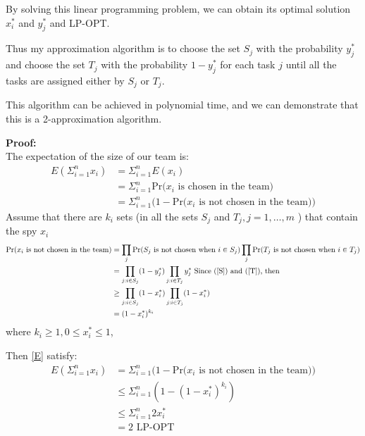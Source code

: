 \documentclass[a4paper,12pt]{article}
\begin{document}
By solving this linear programming problem, we can obtain its optimal solution $x_i^*$ and $y_j^*$ and LP-OPT. 

Thus my approximation algorithm is to choose the set $S_j$ with the probability $y_j^*$ and choose the set $T_j$ with the probability $1-y_j^*$ for each task $j$ until all the tasks are assigned either by $S_j$ or $T_j$. 

This algorithm can be achieved in polynomial time, and we can demonstrate that this is a 2-approximation algorithm.

\noindent \textbf{Proof:\\}
The expectation  of the size of our team is:
\begin{align} 
E(\Sigma_{ i= 1}^n   x_{i}) & = \Sigma_{ i= 1}^n   E(x_{i})\\ 
& = \Sigma_{ i= 1}^n  \text{Pr($x_i$ is chosen in the team)}\\ 
& = \Sigma_{ i= 1}^n  (1-\text{Pr($x_i$ is not chosen in the team))} \label{E}
\end{align} 
Assume that there are $k_i$ sets (in all the sets $S_j$ and $T_j, j=1, \dots , m $ ) that contain the spy $x_i$
\begin{align}
\text{Pr($x_i$ is not chosen in the team)} & = \prod_{j}\text{Pr($S_j$ is not chosen when $i \in S_j$)} \prod_j \text{Pr($T_j$ is not chosen when $i \in T_j$)}\\
&= \prod_{j: i \in S_j} (1-y_j^*) \prod_{j: i \in T_j} y_j^*\text{ Since (\ref{S}) and (\ref{T}), then }\\ 
&\geq  \prod_{j: i \in S_j} (1-x_i^*) \prod_{j: i \in T_j} (1-x_i^*)\\
& = (1-x_i^*)^{k_i} 
\end{align}
where $k_i \geq 1, 0 \leq x_i^* \leq 1$,

Then \eqref{E} satisfy:\\
\begin{align}
E(\Sigma_{ i= 1}^n   x_{i}) & =  \Sigma_{ i= 1}^n  (1-\text{Pr($x_i$ is not chosen in the team))}\\
& \leq  \Sigma_{ i= 1}^n  (1- (1-x_i^*)^{k_i} ) \\ \label{show}
& \leq \Sigma_{ i= 1}^n 2 x_i^*  \\ 
& =2 \text{ LP-OPT}
\end{align} 
\end{document}
